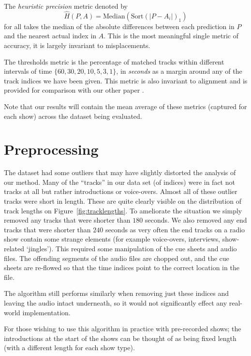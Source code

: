 \documentclass[twocolumn]{article}
\begin{document}
	The \textit{heuristic precision} metric denoted by 
	\[
	\hat H(P,A) =  \mathrm{Median}\left(    \mathrm{Sort}\left( |P-A_i|\right)_1 \right)
	\] for all
	takes the median of the absolute differences between each prediction in $P$ and the nearest actual index in $A$. This is the most meaningful single metric of accuracy, it is largely invariant to misplacements.
	
	The thresholds metric is the percentage of matched tracks within different intervals of time $\{60, 30, 20, 10, 5, 3, 1\}$, in \emph{seconds} as a margin around any of the track indices we have been given. This metric is also invariant to alignment and is provided for comparison with our other paper \cite{scarfe2013long}.
	
	Note that our results will contain the mean average of these metrics (captured for each show) across the dataset being evaluated. 
	
	\section{Preprocessing}\label{proprocessing} %
	
	The dataset had some outliers that may have slightly distorted the analysis of our method. Many of the ``tracks'' in our data set (of indices) were in fact not tracks at all but rather introductions or voice-overs. Almost all of these outlier tracks were short in length. These are quite clearly visible on the distribution of track lengths on Figure~\ref{fig:tracklengths}. To ameliorate the situation we simply removed any tracks that were shorter than $180$ seconds. We also removed any end tracks that were shorter than $240$ seconds as very often the end tracks on a radio show contain some strange elements (for example voice-overs, interviews, show-related `jingles'). This required some manipulation of the cue sheets and audio files. The offending segments of the audio files are chopped out, and the cue sheets are re-flowed so that the time indices point to the correct location in the file. 
	
	The algorithm still performs similarly when removing just these indices and leaving the audio intact underneath, so it would not significantly effect any real-world implementation. 
	
	For those wishing to use this algorithm in practice with pre-recorded shows; the introductions at the start of the shows can be thought of as being fixed length (with a different length for each show type).
	
\end{document}
